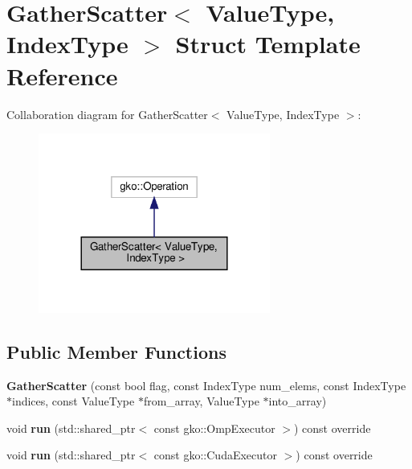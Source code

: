 \hypertarget{structGatherScatter}{}\section{Gather\+Scatter$<$ Value\+Type, Index\+Type $>$ Struct Template Reference}
\label{structGatherScatter}


Collaboration diagram for Gather\+Scatter$<$ Value\+Type, Index\+Type $>$\+:
\nopagebreak
\begin{figure}[H]
\begin{center}
\leavevmode
\includegraphics[width=216pt]{structGatherScatter__coll__graph}
\end{center}
\end{figure}
\subsection*{Public Member Functions}
\begin{DoxyCompactItemize}
\item 
\mbox{\label{structGatherScatter_a09a345e2119afe701a6eef13dc6b7b8e}} 
{\bfseries Gather\+Scatter} (const bool flag, const Index\+Type num\+\_\+elems, const Index\+Type $\ast$indices, const Value\+Type $\ast$from\+\_\+array, Value\+Type $\ast$into\+\_\+array)
\item 
\mbox{\label{structGatherScatter_a9c88973579ff26ff2bb0fb66986877cd}} 
void {\bfseries run} (std\+::shared\+\_\+ptr$<$ const gko\+::\+Omp\+Executor $>$) const override
\item 
\mbox{\label{structGatherScatter_a343597d25452d1b313fdabd4409107f3}} 
void {\bfseries run} (std\+::shared\+\_\+ptr$<$ const gko\+::\+Cuda\+Executor $>$) const override
\end{DoxyCompactItemize}
